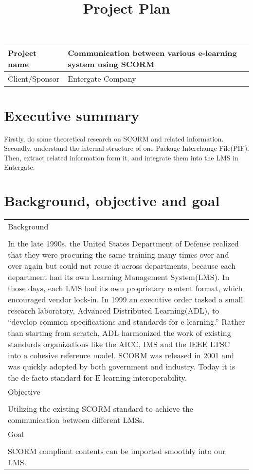 \documentclass{report}
\begin{document}
 
\title{Project Plan} 
\maketitle 

\begin{table}[h]
	\begin{tabularx}{\textwidth}{| l | X |}
	\hline
	Project name & Communication between various e-learning system using SCORM \\
	\hline
	Client/Sponsor & Entergate Company \\
	\hline
\end{tabularx}
\end{table} 

\section{Executive summary}
Firstly, do some theoretical research on SCORM and related information. Secondly, understand the internal structure of one Package Interchange 
File(PIF). Then, extract related information form it, and integrate them into the LMS in Entergate.

\section{Background, objective and goal}
\begin{table}[h]
	\begin{tabularx}{\textwidth}{| X |}
	\hline
	Background \\
	\\
	In the late 1990s, the United States Department of Defense realized that they were procuring the same training many times over and over again but 
	could not reuse it across departments, because each department had its own Learning Management System(LMS). In those days, each LMS had its own 
	proprietary content format, which encouraged vendor lock-in. In 1999 an executive order tasked a small research laboratory, Advanced Distributed 
	Learning(ADL), to ``develop common specifications and standards for e-learning.'' Rather than starting from scratch, ADL harmonized the work of 
	existing standards organizations like the AICC, IMS and the IEEE LTSC into a cohesive reference model. SCORM was released in 2001 and was quickly 
	adopted by both government and industry. Today it is the de facto standard for E-learning interoperability. \\ [1ex]

	\hline
		Objective \\
		\\
		Utilizing the existing SCORM standard to achieve the communication between different LMSs. \\ [1ex]
	
	\hline
		Goal \\
		\\
		SCORM compliant contents can be imported smoothly into our LMS. \\  [1ex]
	\hline
\end{tabularx}
\end{table}
\end{document}
